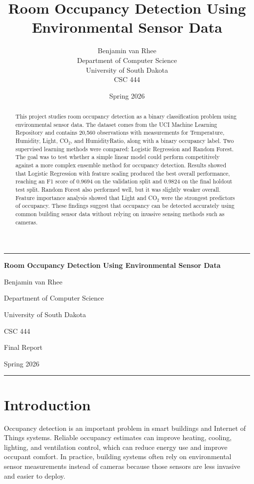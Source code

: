 \documentclass[12pt]{article}
\title{Room Occupancy Detection Using Environmental Sensor Data}
\author{Benjamin van Rhee\\Department of Computer Science\\University of South Dakota\\CSC 444}
\date{Spring 2026}
\begin{document}
\begin{titlepage}
    \centering
    {\color{usdred}\rule{\textwidth}{1.2pt}\par}
    \vspace{1.2cm}
    {\Huge\bfseries Room Occupancy Detection Using Environmental Sensor Data\par}
    \vspace{1.2cm}
    {\Large Benjamin van Rhee\par}
    \vspace{0.4cm}
    {\large Department of Computer Science\par}
    {\large University of South Dakota\par}
    {\large CSC 444\par}
    \vfill
    {\large Final Report\par}
    \vspace{0.3cm}
    {\large Spring 2026\par}
    \vspace{1.2cm}
    {\color{usdred}\rule{\textwidth}{1.2pt}\par}
\end{titlepage}

\begin{abstract}
This project studies room occupancy detection as a binary classification problem using environmental sensor data. The dataset comes from the UCI Machine Learning Repository and contains 20,560 observations with measurements for Temperature, Humidity, Light, CO$_2$, and HumidityRatio, along with a binary occupancy label. Two supervised learning methods were compared: Logistic Regression and Random Forest. The goal was to test whether a simple linear model could perform competitively against a more complex ensemble method for occupancy detection. Results showed that Logistic Regression with feature scaling produced the best overall performance, reaching an F1 score of 0.9694 on the validation split and 0.9824 on the final holdout test split. Random Forest also performed well, but it was slightly weaker overall. Feature importance analysis showed that Light and CO$_2$ were the strongest predictors of occupancy. These findings suggest that occupancy can be detected accurately using common building sensor data without relying on invasive sensing methods such as cameras.
\end{abstract}

\section{Introduction}
Occupancy detection is an important problem in smart buildings and Internet of Things systems. Reliable occupancy estimates can improve heating, cooling, lighting, and ventilation control, which can reduce energy use and improve occupant comfort. In practice, building systems often rely on environmental sensor measurements instead of cameras because those sensors are less invasive and easier to deploy.
\end{document}
